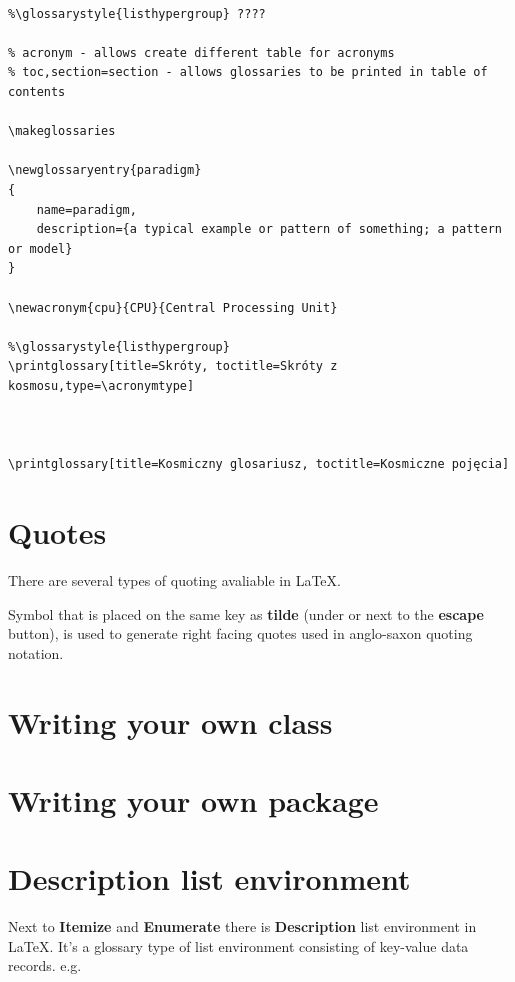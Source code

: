 \begin{verbatim}

%\glossarystyle{listhypergroup} ????

% acronym - allows create different table for acronyms
% toc,section=section - allows glossaries to be printed in table of contents

\makeglossaries

\newglossaryentry{paradigm}
{
    name=paradigm,
    description={a typical example or pattern of something; a pattern or model}
}

\newacronym{cpu}{CPU}{Central Processing Unit}

%\glossarystyle{listhypergroup}
\printglossary[title=Skróty, toctitle=Skróty z kosmosu,type=\acronymtype]



\printglossary[title=Kosmiczny glosariusz, toctitle=Kosmiczne pojęcia] 
\end{verbatim}

\section{Quotes}

There are several types of quoting avaliable in \LaTeX.

Symbol that is placed on the same key as \textbf{tilde} (under or next to the \textbf{escape} button), is used to generate right facing quotes used in anglo-saxon quoting notation.

\fbox{\textcolor{red}{To finish}}

\section{Writing your own class}

\fbox{\textcolor{red}{To be implemented}}

\section{Writing your own package}

\fbox{\textcolor{red}{To be implemented}}

\section{Description list environment}

Next to \textbf{Itemize} and \textbf{Enumerate} there is \textbf{Description} list environment in \LaTeX . It's a glossary type of list environment consisting of key-value data records. e.g.

